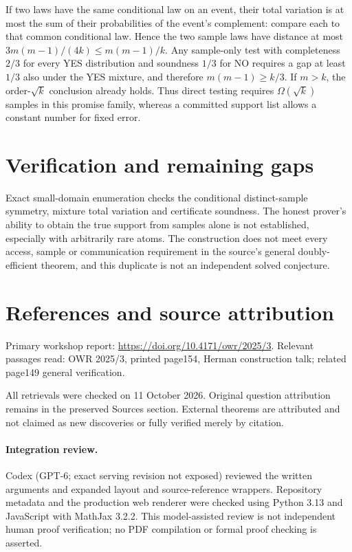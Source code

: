 \documentclass[11pt]{article}
\begin{document}
If two laws have the same conditional law on an event, their total variation is at most the sum of their probabilities of the event's complement: compare each to that common conditional law. Hence the two sample laws have distance at most $3m(m-1)/(4k)\le m(m-1)/k$. Any sample-only test with completeness $2/3$ for every YES distribution and soundness $1/3$ for NO requires a gap at least $1/3$ also under the YES mixture, and therefore $m(m-1)\ge k/3$. If $m>k$, the order-$\sqrt k$ conclusion already holds. Thus direct testing requires $\Omega(\sqrt k)$ samples in this promise family, whereas a committed support list allows a constant number for fixed error.
\section{Verification and remaining gaps}
Exact small-domain enumeration checks the conditional distinct-sample symmetry, mixture total variation and certificate soundness. The honest prover's ability to obtain the true support from samples alone is not established, especially with arbitrarily rare atoms. The construction does not meet every access, sample or communication requirement in the source's general doubly-efficient theorem, and this duplicate is not an independent solved conjecture.

\section{References and source attribution}
Primary workshop report: \url{https://doi.org/10.4171/owr/2025/3}. Relevant passages read: OWR 2025/3, printed page154, Herman construction talk; related page149 general verification.

All retrievals were checked on 11 October 2026. Original question attribution remains in the preserved Sources section. External theorems are attributed and not claimed as new discoveries or fully verified merely by citation.


\paragraph{Integration review.} Codex (GPT-6; exact serving revision not exposed) reviewed the written arguments and expanded layout and source-reference wrappers. Repository metadata and the production web renderer were checked using Python 3.13 and JavaScript with MathJax 3.2.2. This model-assisted review is not independent human proof verification; no PDF compilation or formal proof checking is asserted.
\end{document}
